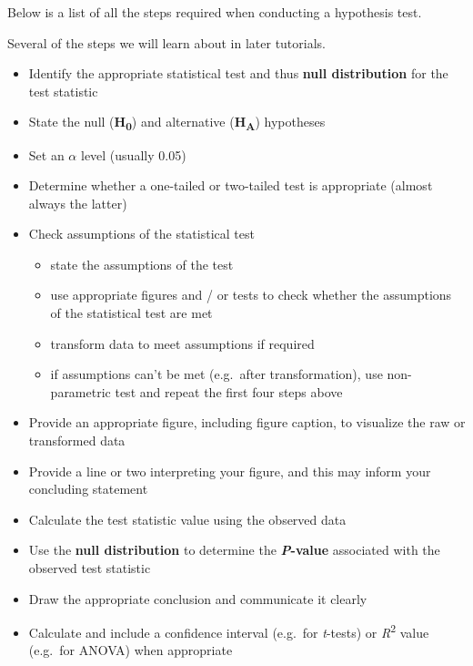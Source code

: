 \documentclass[
]{book}
\providecommand{\tightlist}{%
  \setlength{\itemsep}{0pt}\setlength{\parskip}{0pt}}
\begin{document}
Below is a list of all the steps required when conducting a hypothesis test.

Several of the steps we will learn about in later tutorials.

\begin{itemize}
\tightlist
\item
  Identify the appropriate statistical test and thus \textbf{null distribution} for the test statistic
\item
  State the null (\textbf{H\textsubscript{0}}) and alternative (\textbf{H\textsubscript{A}}) hypotheses\\
\item
  Set an \(\alpha\) level (usually 0.05)\\
\item
  Determine whether a one-tailed or two-tailed test is appropriate (almost always the latter)
\item
  Check assumptions of the statistical test

  \begin{itemize}
  \tightlist
  \item
    state the assumptions of the test\\
  \item
    use appropriate figures and / or tests to check whether the assumptions of the statistical test are met
  \item
    transform data to meet assumptions if required
  \item
    if assumptions can't be met (e.g.~after transformation), use non-parametric test and repeat the first four steps above
  \end{itemize}
\item
  Provide an appropriate figure, including figure caption, to visualize the raw or transformed data\\
\item
  Provide a line or two interpreting your figure, and this may inform your concluding statement\\
\item
  Calculate the test statistic value using the observed data\\
\item
  Use the \textbf{null distribution} to determine the \textbf{\emph{P}-value} associated with the observed test statistic\\
\item
  Draw the appropriate conclusion and communicate it clearly\\
\item
  Calculate and include a confidence interval (e.g.~for \emph{t}-tests) or \emph{R}\textsuperscript{2} value (e.g.~for ANOVA) when appropriate
\end{itemize}
\end{document}
